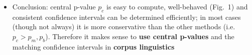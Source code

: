 \documentclass[a4paper]{article}
\begin{document}
\begin{itemize}
\item Conclusion: central p-value $p_c$ is easy to compute, well-behaved (Fig.~1) and consistent confidence intervals can be determined efficiently; in most cases (though not always) it is more conservative than the other methods (i.e.\ $p_c > p_m, p_b$).  Therefore it makes sense to \textbf{use central p-values} and the matching confidence intervals in \textbf{corpus linguistics}
\end{itemize}









  
\end{document}
